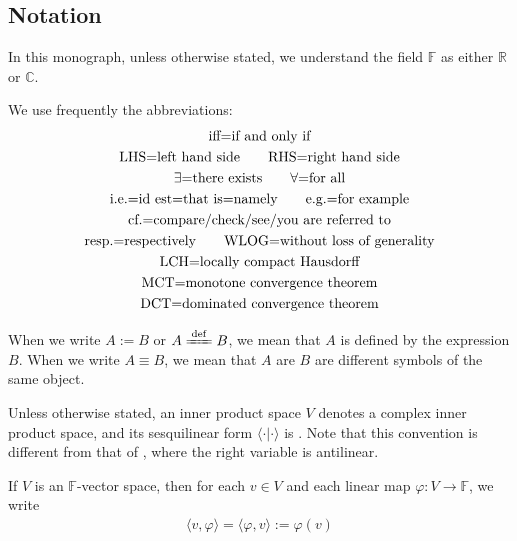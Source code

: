 \documentclass[12pt,b5paper,notitlepage]{article}
\theoremstyle{definition}
\theoremstyle{plain}
\newcommand{\bk}[1]{\langle {#1}\rangle}
\newcommand{\Cbb}{\mathbb C}
\newcommand{\Rbb}{\mathbb R}
\newcommand{\Fbb}{\mathbb F}
\numberwithin{equation}{section}
\begin{document}
\subsection{Notation}

In this monograph, unless otherwise stated, we understand the field $\Fbb$ as either $\Rbb$ or $\Cbb$.

We use frequently the abbreviations:
\begin{gather*}
\text{iff=if and only if}\\
\text{LHS=left hand side}\qquad
\text{RHS=right hand side}\\
\text{$\exists$=there exists}\qquad \text{$\forall$=for all}\\
\text{i.e.=id est=that is=namely}\qquad\text{e.g.=for example}\\
\text{cf.=compare/check/see/you are referred to}\\
\text{resp.=respectively}\qquad 
\text{WLOG=without loss of generality}\\
\text{LCH=locally compact Hausdorff\index{00@LCH=locally compact Hausdorff}}\\
\text{MCT=monotone convergence theorem}\index{00@MCT=monotone convergence theorem}\\
\text{DCT=dominated convergence theorem}\index{00@DCT=dominated convergence theorem}
\end{gather*}

When we write $A:=B$ or $A\xlongequal{\mathrm{def}}B$, we mean that $A$ is defined by the expression $B$. When we write $A\equiv B$, we mean that $A$ are $B$ are different symbols of the same object.





Unless otherwise stated, an inner product space $V$ denotes a complex inner product space, and its sesquilinear form $\bk{\cdot|\cdot}$ is . Note that this convention is different from that of \cite{Gui-A}, where the right variable is antilinear.


If $V$ is an $\Fbb$-vector space, then for each $v\in V$ and each linear map $\varphi:V\rightarrow\Fbb$, we write
\begin{align*}
\bk{v,\varphi}=\bk{\varphi,v}:=\varphi(v)
\end{align*}
\end{document}
